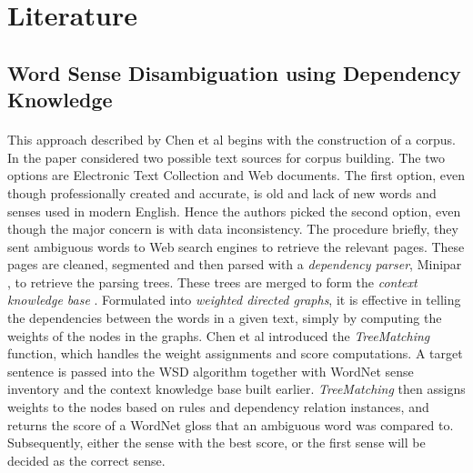 \documentclass[12 pt]{article}
\begin{document}
\section{Literature}
\label{literature}
\subsection{Word Sense Disambiguation using Dependency Knowledge}
\paragraph{}
This approach described by Chen et al \cite{unsupervised} begins with the construction of a corpus. In the paper considered two possible text sources for corpus building. The two options are Electronic Text Collection and Web documents. The first option, even though professionally created and accurate, is old and lack of new words and senses used in modern English. Hence the authors picked the second option, even though the major concern is with data inconsistency. The procedure briefly, they sent ambiguous words to Web search engines to retrieve the relevant pages. These pages are cleaned, segmented and then parsed with a \textit{dependency parser}, Minipar \cite{minipar}, to retrieve the parsing trees. These trees are merged to form the \textit{context knowledge base} \cite{unsupervised}. Formulated into \textit{weighted directed graphs}, it is effective in telling the dependencies between the words in a given text, simply by computing the weights of the nodes in the graphs. Chen et al introduced the \textit{TreeMatching} function, which handles the weight assignments and score computations. A target sentence is passed into the WSD algorithm together with WordNet sense inventory and the context knowledge base built earlier. \textit{TreeMatching} then assigns weights to the nodes based on rules and dependency relation instances, and returns the score of a WordNet gloss that an ambiguous word was compared to. Subsequently, either the sense with the best score, or the first sense will be decided as the correct sense.
\end{document}
